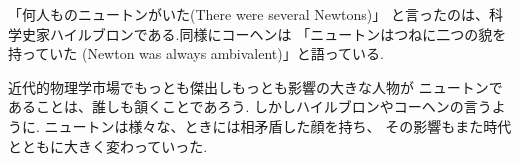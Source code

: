 \documentclass{jsarticle}
\begin{document}
「何人ものニュートンがいた(There were several Newtons)」
と言ったのは、科学史家ハイルブロンである.同様にコーヘンは
「ニュートンはつねに二つの貌を持っていた
(Newton was always ambivalent)」と語っている.

近代的物理学市場でもっとも傑出しもっとも影響の大きな人物が
ニュートンであることは、誰しも頷くことであろう.
しかしハイルブロンやコーヘンの言うように.
ニュートンは様々な、ときには相矛盾した顔を持ち、
その影響もまた時代とともに大きく変わっていった.
\end{document}
